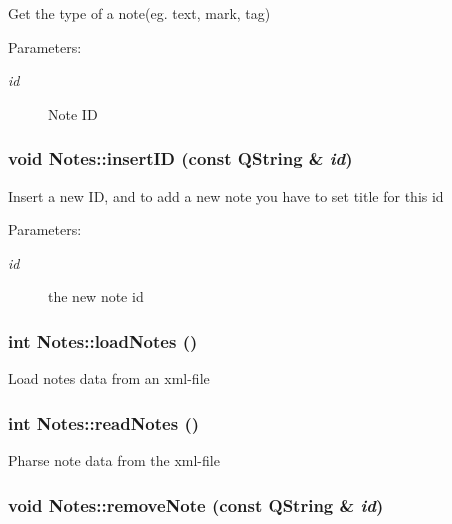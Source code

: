 Get the type of a note(eg. text, mark, tag) \begin{Desc}
\item[Parameters:]
\begin{description}
\item[{\em id}]Note ID \end{description}
\end{Desc}
\hypertarget{classNotes_08ba874a751ba5fde4620ac5b5ff8037}{
\subsubsection[{insertID}]{\setlength{\rightskip}{0pt plus 5cm}void Notes::insertID (const QString \& {\em id})}}
\label{classNotes_08ba874a751ba5fde4620ac5b5ff8037}


Insert a new ID, and to add a new note you have to set title for this id \begin{Desc}
\item[Parameters:]
\begin{description}
\item[{\em id}]the new note id \end{description}
\end{Desc}
\hypertarget{classNotes_91273d4a534e6426adb63bef043b4dbc}{
\subsubsection[{loadNotes}]{\setlength{\rightskip}{0pt plus 5cm}int Notes::loadNotes ()}}
\label{classNotes_91273d4a534e6426adb63bef043b4dbc}


Load notes data from an xml-file \hypertarget{classNotes_a47d6a7af0c2674fe6d3372280755d5b}{
\subsubsection[{readNotes}]{\setlength{\rightskip}{0pt plus 5cm}int Notes::readNotes ()}}
\label{classNotes_a47d6a7af0c2674fe6d3372280755d5b}


Pharse note data from the xml-file \hypertarget{classNotes_86b09275d829523b0eb42da6b008a580}{
\subsubsection[{removeNote}]{\setlength{\rightskip}{0pt plus 5cm}void Notes::removeNote (const QString \& {\em id})}}
\label{classNotes_86b09275d829523b0eb42da6b008a580}


